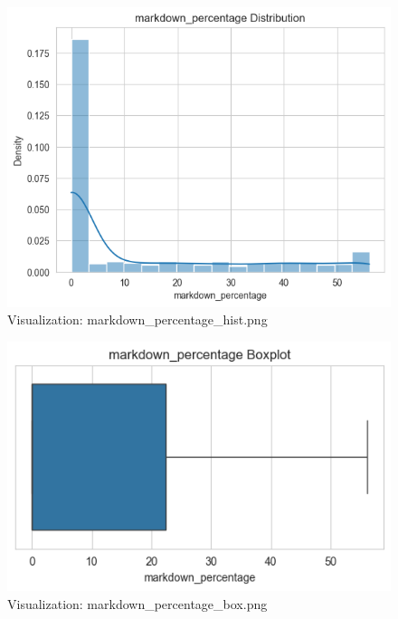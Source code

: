 \documentclass{article}%
\begin{document}
\vspace{10pt}%
\\%
\begin{minipage}[c]{0.48\textwidth}%


\begin{figure}[H]%
\centering%
\includegraphics[width=\linewidth]{output/plots/markdown_percentage_hist.png}%
\caption{Visualization: markdown\_percentage\_hist.png}%
\end{figure}

%
\end{minipage}%
\begin{minipage}[c]{0.48\textwidth}%


\begin{figure}[H]%
\centering%
\includegraphics[width=\linewidth]{output/plots/markdown_percentage_box.png}%
\caption{Visualization: markdown\_percentage\_box.png}%
\end{figure}

%
\end{minipage}%
\end{document}
